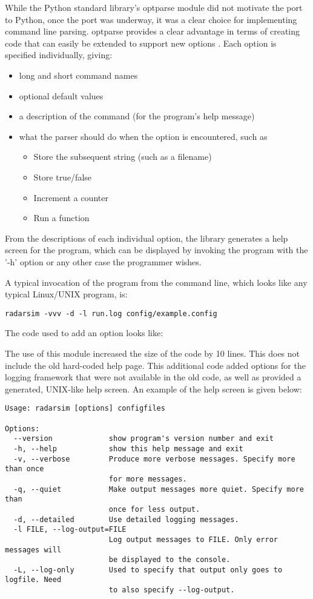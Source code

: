 \documentclass[twocolumn]{article}
\begin{document}
While the Python standard library's optparse module did not motivate the port to
Python, once the port was underway, it was a clear choice for implementing
command line parsing. optparse provides a clear advantage in terms of creating
code that can easily be extended to support new options \cite{optparse}. Each
option is specified individually, giving:
\begin{itemize}
    \item long and short command names
    \item optional default values
    \item a description of the command (for the program's help message)
    \item what the parser should do when the option is encountered, such as
    \begin{itemize}
        \item Store the subsequent string (such as a filename)
        \item Store true/false
        \item Increment a counter
        \item Run a function
    \end{itemize}
\end{itemize}
From the descriptions of each individual option, the library generates a
help screen for the program, which can be displayed by invoking the program
with the '-h' option or any other case the programmer wishes.

A typical invocation of the program from the command line, which looks like
any typical Linux/UNIX program, is:

{\scriptsize\verb$radarsim -vvv -d -l run.log config/example.config$}

The code used to add an option looks like:

\lstset{language=Python}


The use of this module increased the size of the code by 10 lines. This does
not include the old hard-coded help page. This additional code added options
for the logging framework that were not available in the old code, as well
as provided a generated, UNIX-like help screen. An example of the help screen
is given below:

{\tiny
\begin{verbatim}
Usage: radarsim [options] configfiles

Options:
  --version             show program's version number and exit
  -h, --help            show this help message and exit
  -v, --verbose         Produce more verbose messages. Specify more than once
                        for more messages.
  -q, --quiet           Make output messages more quiet. Specify more than
                        once for less output.
  -d, --detailed        Use detailed logging messages.
  -l FILE, --log-output=FILE
                        Log output messages to FILE. Only error messages will
                        be displayed to the console.
  -L, --log-only        Used to specify that output only goes to logfile. Need
                        to also specify --log-output.
\end{verbatim}}
\end{document}
